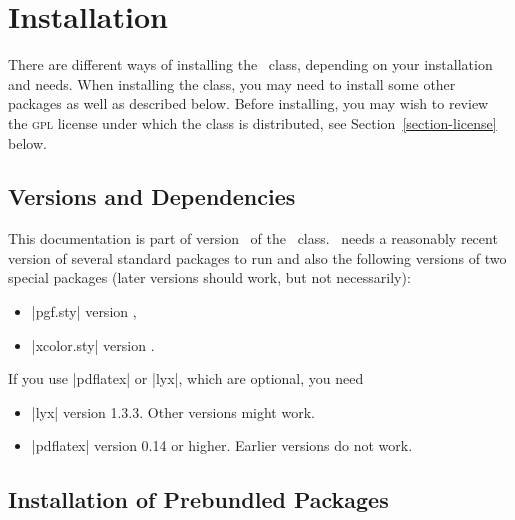 
%

\section{Installation}

\label{section-installation}


There are different ways of installing the \beamer\ class, depending
on your installation and needs. When installing the class, you may
need to install some other packages as well as described below. Before
installing, you may wish to review the \textsc{gpl} license under
which the class is distributed, see Section~\ref{section-license} below.



\subsection{Versions and Dependencies}

This documentation is part of version \version\ of the \beamer\
class. \beamer\ needs a reasonably recent version of several standard
packages to run and also the following versions of two special
packages (later versions should work, but not necessarily): 
\begin{itemize}
\item
  |pgf.sty| version \pgfversion,
\item
  |xcolor.sty| version \xcolorversion.
\end{itemize}

If you use |pdflatex| or |lyx|, which are optional, you need
\begin{itemize}
\item
  |lyx| version 1.3.3. Other versions might work.
\item
  |pdflatex| version 0.14 or higher. Earlier versions do not work. 
\end{itemize}



\subsection{Installation of Prebundled Packages}

